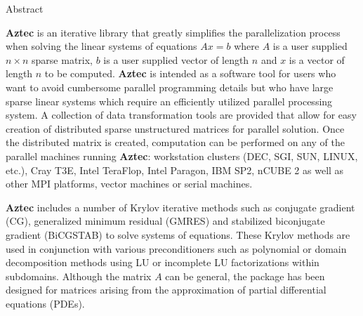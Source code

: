 \documentclass{article}[12pt]
\newcommand{\Az}  {{\bf Aztec}}
\begin{document}
{\centering\large Abstract \\[1em]}

\Az{} is an iterative library that greatly simplifies the parallelization
process when solving the linear systems of equations $Ax = b$ where $A$ is a
user supplied $n \times n$ sparse matrix, $b$ is a user supplied vector of
length $n$ and $x$ is a vector of length $n$ to be computed. \Az{} is intended
as a software tool for users who want to avoid cumbersome parallel programming
details but who have large sparse linear systems which require an efficiently
utilized parallel processing system.  A collection of data transformation tools
are provided that allow for easy creation of distributed sparse unstructured
matrices for parallel solution. Once the distributed matrix is created,
computation can be performed on any of the parallel machines running \Az{}:
workstation clusters (DEC, SGI, SUN, LINUX, etc.), Cray T3E,
Intel TeraFlop, Intel Paragon, IBM SP2, nCUBE 2
as well as other
MPI platforms, vector machines or serial machines.

\Az{} includes a number of Krylov iterative methods such as conjugate gradient
(CG), generalized minimum residual (GMRES) and stabilized biconjugate gradient
(BiCGSTAB) to solve systems of equations.  These Krylov methods are used in
conjunction with various preconditioners such as polynomial or domain
decomposition methods using LU or incomplete LU factorizations within
subdomains. Although the matrix $A$ can be general, the package has been
designed for matrices arising from the approximation of partial differential
equations (PDEs).


\vfill

\newpage


\pagestyle{fancyplain}
\addtolength{\headwidth}{\marginparsep}
\renewcommand{\sectionmark}[1]{\markboth{#1}{}}
\rhead[\fancyplain{}{\bfseries\leftmark}]%
      {\fancyplain{}{\bfseries\thepage}}
\cfoot{}

\large
\tableofcontents

\newpage
\end{document}
